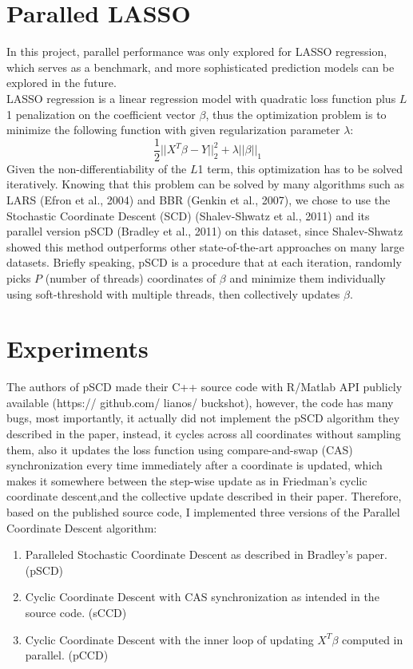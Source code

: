 \documentclass[11 pt, a4paper]{article}  %
\begin{document}
\section{Paralled LASSO}
In this project, parallel performance was only explored for LASSO regression, which serves as a benchmark, and more sophisticated prediction models can be explored in the future. \\
LASSO regression is a linear regression model with quadratic loss function plus $L$1 penalization on the coefficient vector $\beta$, thus the optimization problem is to minimize the following function with given regularization parameter $\lambda$:
\[\frac{1}{2}||X^T\beta-Y||_2^2+\lambda ||\beta||_1 \]
Given the non-differentiability of the $L$1 term, this optimization has to be solved iteratively. Knowing that this problem can be solved by many algorithms such as LARS (Efron et al., 2004) and BBR (Genkin et al., 2007), we chose to use the Stochastic Coordinate Descent (SCD) (Shalev-Shwatz et al., 2011) \cite{shalev2011stochastic} and its parallel version pSCD (Bradley et al., 2011)\cite{bradley2011parallel} on this dataset, since Shalev-Shwatz showed this method outperforms other state-of-the-art approaches on many large datasets. Briefly speaking, pSCD is a procedure that at each iteration, randomly picks $P$ (number of threads) coordinates of $\beta$ and minimize them individually using soft-threshold with multiple threads, then collectively updates $\beta$.

\section{Experiments}
The authors of pSCD made their C++ source code with R/Matlab API publicly available (https:// github.com/ lianos/ buckshot), however, the code has many bugs, most importantly, it actually did not implement the pSCD algorithm they described in the paper, instead, it cycles across all coordinates without sampling them, also it updates the loss function using compare-and-swap (CAS) synchronization every time immediately after a coordinate is updated, which makes it somewhere between the step-wise update as in Friedman's \cite{friedman2007pathwise} cyclic coordinate descent,and the collective update described in their paper. Therefore, based on the published source code, I implemented three versions of the Parallel Coordinate Descent algorithm:  
\begin{enumerate}
\item Paralleled Stochastic Coordinate Descent as described in Bradley's paper. (pSCD)
\item Cyclic Coordinate Descent with CAS synchronization as intended in the source code. (sCCD)
\item Cyclic Coordinate Descent with the inner loop of updating $X^T\beta$ computed in parallel. (pCCD)
\end{enumerate}
\end{document}
